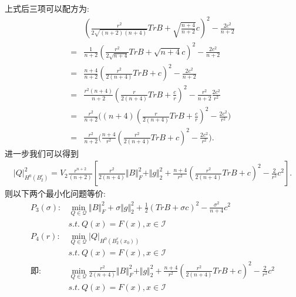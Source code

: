\documentclass[UTF8]{ctexart}
\begin{document}

上式后三项可以配方为:
\begin{align*}
&(\frac{r^{2}}{2\sqrt{(n+2)(n+4)}} TrB+\sqrt{\frac{n+4}{n+2}}c)^{2}-\frac{2c^{2}}{n+2}\\
=&\frac{1}{n+2}(\frac{r^{2}}{2\sqrt{n+4}} TrB+\sqrt{n+4}c)^{2}-\frac{2c^{2}}{n+2}\\
=&\frac{n+4}{n+2}(\frac{r^{2}}{2(n+4)} TrB+c)^{2}-\frac{2c^{2}}{n+2}\\
=&\frac{r^2(n+4)}{n+2}(\frac{r}{2(n+4)} TrB+\frac{c}{r})^{2}-\frac{r^2}{n+2}\frac{2c^{2}}{r^2}\\
=&\frac{r^2}{n+2}\big((n+4)(\frac{r}{2(n+4)} TrB+\frac{c}{r})^{2}-\frac{2c^{2}}{r^2}\big)\\
=&\frac{r^2}{n+2}\big(\frac{n+4}{r^2}(\frac{r^2}{2(n+4)} TrB+c)^{2}-\frac{2c^{2}}{r^2}\big).
\end{align*}
进一步我们可以得到
\begin{align*}
\vert Q\vert_{H^{0}{(B^{r}_{2})}}^{2}=
V_{2}\frac{r^{n+2}}{(n+2)}[\frac{r^{2}}{2(n+4)}\Vert B\Vert^{2}_{F}+\Vert g\Vert^{2}_{2}+\frac{n+4}{r^2}(\frac{r^2}{2(n+4)}TrB+c)^{2}-\frac{2}{r^2}c^{2}].
\end{align*}
则以下两个最小化问题等价: 
\begin{align*}
P_{3}(\sigma):&\mathop{\min}\limits_{Q\in\mathcal{Q}}\Vert B\Vert^{2}_{F}+\sigma\Vert g\Vert^{2}_{2}+\frac{1}{2}(TrB+\sigma c)^{2}-\frac{\sigma^2}{n+4}c^2\\
&s.t. \  Q(x)=F(x), x\in \mathcal{I}\\
P_{4}(r):&\mathop{\min}\limits_{Q\in\mathcal{Q}}|Q|_{H^{0}(B^{r}_{2}(x_{0}))}\\
&s.t. \  Q(x)=F(x), x\in \mathcal{I}\\
\mbox{即:}&\mathop{\min}\limits_{Q\in\mathcal{Q}} \frac{r^{2}}{2(n+4)}\Vert B\Vert^{2}_{F}+\Vert g\Vert^{2}_{2}+\frac{n+4}{r^2}(\frac{r^2}{2(n+4)}TrB+c)^{2}-\frac{2}{r^2}c^{2}\\
&s.t. \  Q(x)=F(x), x\in \mathcal{I}
\end{align*}
\end{document}
